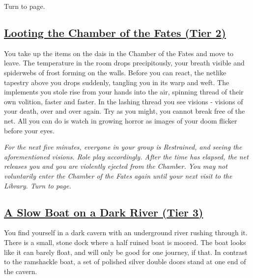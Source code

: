 \documentclass[sheet]{GL2020}
\begin{document}
\vspace{0.5cm}

Turn to page\pageref{ChamberoftheFates}.

\clearpage

\begin{center}\section*{\underline{Looting the Chamber of the Fates (Tier 2)}}\end{center}
\label{LootingChamberofFates}

You take up the items on the dais in the Chamber of the Fates and move to leave. The temperature in the room drops precipitously, your breath visible and spiderwebs of frost forming on the walls. Before you can react, the netlike tapestry above you drops suddenly, tangling you in its warp and weft. The implements you stole rise from your hands into the air, spinning thread of their own volition, faster and faster. In the lashing thread you see visions - visions of your death, over and over again. Try as you might, you cannot break free of the net. All you can do is watch in growing horror as images of your doom flicker before your eyes.

\vspace{0.5cm}

\emph{For the next five minutes, everyone in your group is Restrained, and seeing the aforementioned visions. Role play accordingly. After the time has elapsed, the net releases you and you are violently ejected from the Chamber. You may not voluntarily enter the Chamber of the Fates again until your next visit to the Library. Turn to page\pageref{DeepStacks}.}

\clearpage

\begin{center}\section*{\underline{A Slow Boat on a Dark River (Tier 3)}}\end{center}
\label{SlowBoatDarkRiver}

You find yourself in a dark cavern with an underground river rushing through it. There is a small, stone dock where a half ruined boat is moored. The boat looks like it can barely float, and will only be good for one journey, if that. In contrast to the ramshackle boat, a set of polished silver double doors stand at one end of the cavern.
\end{document}
